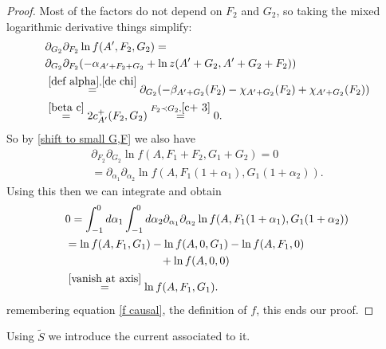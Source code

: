 \documentclass[b5paper,draft,openbib,12pt]{memoir}
\newtheorem{Def}{Definition}
\begin{document}
\begin{proof}
Most of the factors do not depend on \(F_2\) and \(G_2\), so taking the mixed logarithmic derivative things simplify:
\begin{align}\notag
&\partial_{G_2}\partial_{F_2} \ln f(A',F_2,G_2)= \\
&\partial_{G_2}\partial_{F_2} ( -\alpha_{A'+F_2+G_2} + \ln z(A'+G_2,A'+G_2+F_2))\\
&\overset{\eqref{def alpha}, \eqref{de chi}}{=}  \partial_{G_2} (-\beta_{A'+G_2}(F_2)-\chi_{A'+G_2}(F_2) + \chi_{A'+G_2}(F_2))\\
&\overset{\eqref{beta c}}{=}2 c^+_{A'}(F_2,G_2)\overset{F_2\prec G_2, \eqref{c+ 3}}{=}0.
\end{align}
So by \eqref{shift to small G,F} we also have
\begin{align}
\partial_{F_2}\partial_{G_2}\ln f(A,F_1+F_2,G_1+G_2)=0\\
=\partial_{\alpha_1}\partial_{\alpha_2}\ln f(A,F_1(1+\alpha_1),G_1(1+\alpha_2)).
\end{align}
Using this then we can integrate and obtain
\begin{align}
&0=\int_{-1}^0d \alpha_1 \int_{-1}^0d \alpha_2  \partial_{\alpha_1}\partial_{\alpha_2}\ln f(A,F_1(1+\alpha_1),G_1(1+\alpha_2))\\
&=\ln f(A,F_1,G_1)-\ln f(A,0,G_1)-\ln f(A,F_1,0)\\\notag 
&\hspace{3cm}+ \ln f(A,0,0)\\
&\overset{\eqref{vanish at axis}}{=}\ln f(A,F_1,G_1).
\end{align}
remembering equation \eqref{f causal}, the definition of \(f\),  this ends our proof.
\end{proof}

Using \(\tilde{S}\) we introduce the current associated to it.

\end{document}
